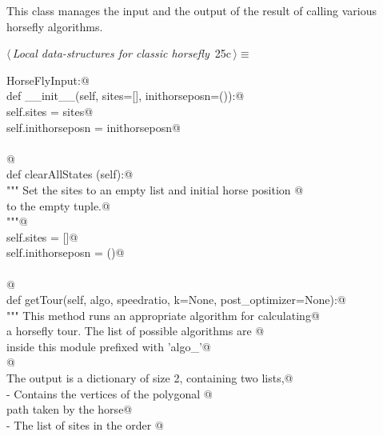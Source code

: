 \documentclass[11.5pt]{report}
\begin{document}
\newchunk This class manages the input and the output of the result of 
calling various horsefly algorithms. 

\begin{flushleft} \small\label{scrap21}\raggedright\small
{} $\langle\,${\itshape Local data-structures for classic horsefly}\nobreak\ {\footnotesize {25c}}$\,\rangle\equiv$
\vspace{-1ex}
\begin{list}{}{} \item
\mbox{}\verb@class HorseFlyInput:@\\
\mbox{}\verb@      def __init__(self, sites=[], inithorseposn=()):@\\
\mbox{}\verb@           self.sites         = sites@\\
\mbox{}\verb@           self.inithorseposn = inithorseposn@\\
\mbox{}\verb@@\\
\mbox{}\verb@           @\\
\mbox{}\verb@      def clearAllStates (self):@\\
\mbox{}\verb@          """ Set the sites to an empty list and initial horse position @\\
\mbox{}\verb@          to the empty tuple.@\\
\mbox{}\verb@          """@\\
\mbox{}\verb@          self.sites = []@\\
\mbox{}\verb@          self.inithorseposn = ()@\\
\mbox{}\verb@@\\
\mbox{}\verb@          @\\
\mbox{}\verb@      def getTour(self, algo, speedratio, k=None, post_optimizer=None):@\\
\mbox{}\verb@          """ This method runs an appropriate algorithm for calculating@\\
\mbox{}\verb@          a horsefly tour. The list of possible algorithms are @\\
\mbox{}\verb@          inside this module prefixed with 'algo_'@\\
\mbox{}\verb@          @\\
\mbox{}\verb@          The output is a dictionary of size 2, containing two lists,@\\
\mbox{}\verb@          - Contains the vertices of the polygonal @\\
\mbox{}\verb@            path taken by the horse@\\
\mbox{}\verb@          - The list of sites in the order @\\

\end{list}
\end{flushleft}
\end{document}
